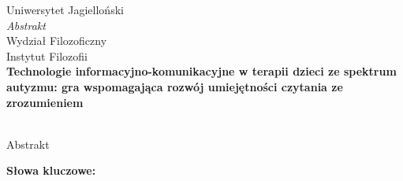 \thispagestyle{firststyle}
{\centering\large
    \vspace{0.5cm}
    Uniwersytet Jagielloński\\
    {\Huge\emph{Abstrakt}\\}
    \vspace{0.5cm}
    Wydział Filozoficzny\\Instytut Filozofii\\
    \vspace{1cm}
    \textbf{Technologie informacyjno-komunikacyjne w terapii dzieci ze spektrum autyzmu: gra wspomagająca rozwój umiejętności czytania ze zrozumieniem\\}
    \vspace{0.5cm}
    \authorname\\
    \vspace{0.5cm}
}

Abstrakt

\vspace{1cm}
\noindent\textbf{Słowa kluczowe: }

